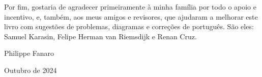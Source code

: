 Por fim, gostaria de agradecer primeiramente à minha família por todo o apoio e incentivo, e, também, aos meus amigos e revisores, que ajudaram a melhorar este livro com sugestões de problemas, diagramas e correções de português. São eles: Samuel Karasin, Felipe Herman van Riemsdijk e Renan Cruz.

\bigskip
\smallskip
\smallskip
\smallskip

\hspace*{\fill} Philippe Fanaro \hspace{0.055cm}

\hspace*{\fill} Outubro de 2024 \hspace{0.05cm}

\clearedpage
\clearedpage